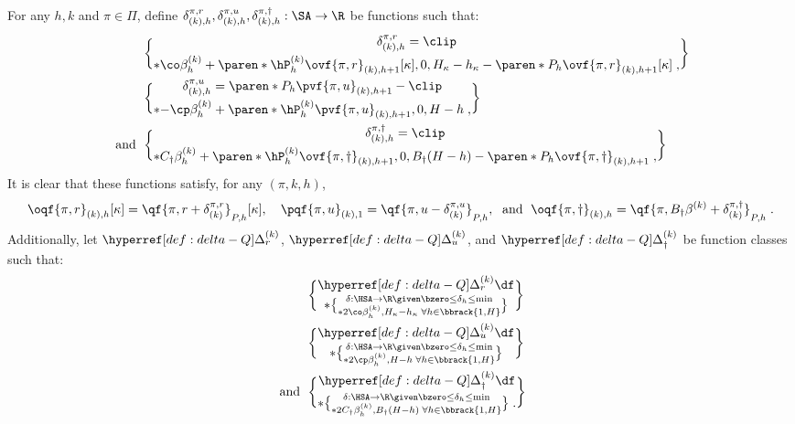 \begin{definition}\label{def:delta-Q}
For any $h, k$ and $\pi \in \Pi$, define 
$\delta^{\pi, r}_{(k), h},
\delta^{\pi, u}_{(k), h}, \delta^{\pi, \dagger}_{(k), h}:\SA \to \R$
be functions such that:
\begin{align*}
&\delta^{\pi, r}_{(k), h} =\clip\brace*{\co \beta^{(k)}_h + \paren*{\hP^{(k)}_h \ovf{\pi, r}_{(k), h+1}[\kappa]}, 0, H_\kappa-h_\kappa}
- \paren*{P_h \ovf{\pi, r}_{(k), h+1}[\kappa]}\;, \\
&\delta^{\pi, u}_{(k), h} =\paren*{P_h \pvf{\pi, u}_{(k), h+1}} - \clip\brace*{-\cp\beta^{(k)}_h + \paren*{\hP^{(k)}_h \pvf{\pi, u}_{(k), h+1}}, 0, H-h}\;,\\
\text{ and }\; 
&\delta^{\pi, \dagger}_{(k), h} =\clip\brace*{C_\dagger \beta^{(k)}_h + \paren*{\hP^{(k)}_h \ovf{\pi, \dagger}_{(k), h+1}}, 0, B_\dagger (H-h)}
- \paren*{P_h \ovf{\pi, \dagger}_{(k), h+1}}\;, \\
\end{align*}
It is clear that these functions satisfy, for any $(\pi, k, h)$,  %
\begin{equation}\label{eq:Q-Q-diff}
\begin{aligned}
\oqf{\pi, r}_{(k), h}[\kappa] = \qf{\pi, r + \delta^{\pi, r}_{(k)}}_{P, h}[\kappa],\quad
\pqf{\pi, u}_{(k), 1} = \qf{\pi, u - \delta^{\pi, u}_{(k)}}_{P, h},\;
\text{ and }\;
\oqf{\pi, \dagger}_{(k), h} = \qf{\pi, B_\dagger \beta^{(k)} + \delta^{\pi, \dagger}_{(k)}}_{P, h}\;.
\end{aligned}
\end{equation}
Additionally, let $\Deltar$, $\Deltau$, and $\Deltac$ be function classes such that:
\begin{align*}
&\Deltar \df  
\brace*{\delta: \HSA\to \R \given 
\bzero \leq \delta_h \leq \min\brace*{2\co \beta^{(k)}_h, H_\kappa-h_\kappa} \; \forall h \in \bbrack{1, H}}\\
&\Deltau \df 
\brace*{\delta: \HSA\to \R \given 
\bzero \leq \delta_h \leq \min \brace*{2\cp \beta^{(k)}_h, H-h} \; \forall h \in \bbrack{1, H}}\\
\text{ and }\;&\Deltac \df 
\brace*{\delta: \HSA\to \R \given 
\bzero \leq \delta_h \leq \min \brace*{2C_\dagger \beta^{(k)}_h, B_\dagger(H-h)} \; \forall h \in \bbrack{1, H}}\;.
\end{align*}
\end{definition}



